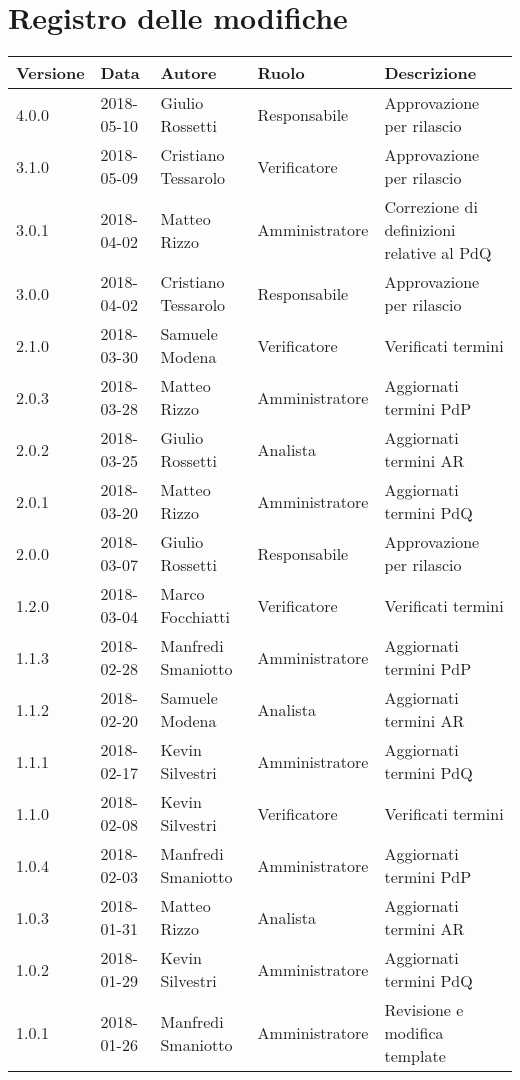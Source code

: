 \documentclass[./AnalisideiRequisiti.tex]{subfiles}
\begin{document}
	
{
	\chapter*{Registro delle modifiche}
\setlength\LTleft{-22mm}
	\begin{longtable}{|p{20mm}|p{20mm}|p{40mm}|p{30mm}|p{50mm}|}
		\hline
		\textbf{Versione} & \textbf{Data} & \textbf{Autore} & \textbf{Ruolo} & \textbf{Descrizione} \\ \hline 
		4.0.0 & 2018-05-10 & Giulio Rossetti & Responsabile & Approvazione per rilascio\\ \hline
		3.1.0 & 2018-05-09 & Cristiano Tessarolo & Verificatore & Approvazione per rilascio\\ \hline
		3.0.1 & 2018-04-02 & Matteo Rizzo & Amministratore & Correzione di definizioni relative al PdQ \\ \hline
		3.0.0 & 2018-04-02 & Cristiano Tessarolo & Responsabile & Approvazione per rilascio\\ \hline
		2.1.0 & 2018-03-30 & Samuele Modena & Verificatore & Verificati termini\\ \hline
		2.0.3 & 2018-03-28 & Matteo Rizzo & Amministratore & Aggiornati termini PdP\\ \hline
		2.0.2 & 2018-03-25 & Giulio Rossetti & Analista & Aggiornati termini AR \\ \hline		
		2.0.1 & 2018-03-20 & Matteo Rizzo & Amministratore & Aggiornati termini PdQ\\ \hline
		
		2.0.0 & 2018-03-07 & Giulio Rossetti & Responsabile & Approvazione per rilascio\\ \hline
		1.2.0 & 2018-03-04 & Marco Focchiatti & Verificatore & Verificati termini\\ \hline
		1.1.3 & 2018-02-28 & Manfredi Smaniotto & Amministratore & Aggiornati termini PdP\\ \hline
		1.1.2 & 2018-02-20 & Samuele Modena & Analista & Aggiornati termini AR \\ \hline		
		1.1.1 & 2018-02-17 & Kevin Silvestri & Amministratore & Aggiornati termini PdQ\\
		\hline
		1.1.0 & 2018-02-08 & Kevin Silvestri & Verificatore & Verificati termini\\ \hline
		1.0.4 & 2018-02-03 & Manfredi Smaniotto & Amministratore & Aggiornati termini PdP\\ \hline
		1.0.3 & 2018-01-31 & Matteo Rizzo & Analista & Aggiornati termini AR \\ \hline		
		1.0.2 & 2018-01-29 & Kevin Silvestri & Amministratore & Aggiornati termini PdQ\\ \hline 
		1.0.1 & 2018-01-26 & Manfredi Smaniotto & Amministratore & Revisione e modifica template\\ \hline
		

\end{longtable}}
\end{document}
